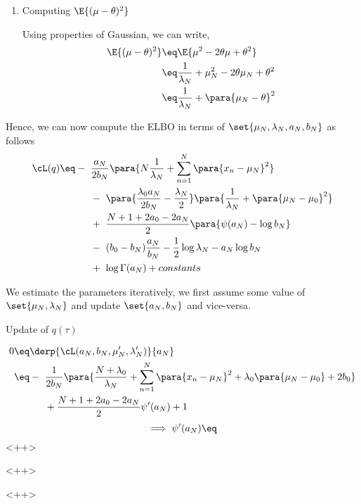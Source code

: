 \documentclass{article}
\begin{document}
\begin{question}
\begin{enumerate}[label=\bt{\theenumi.}]
		\item Computing $\E{(\mu - \theta)^2}$

			Using properties of Gaussian, we can write,
			\begin{align*}
				\E{(\mu - \theta)^2}	&\eq	\E{\mu^2 - 2 \theta \mu + \theta^2} \\
				&\eq	\frac{1}{\lambda_N} +  \mu_N^2 - 2 \theta \mu_N + \theta^2 \\
				&\eq	\frac{1}{\lambda_N} + \para{\mu_N - \theta}^2
			\end{align*}

	\end{enumerate}

	Hence, we can now compute the ELBO in terms of $\set{\mu_N, \lambda_N, a_N, b_N}$ as follows
	\begin{align*}
		\cL(q)	&\eq	- \ \frac{a_N}{2 b_N} \para{N \frac{1}{\lambda_N} + \sum_{n = 1}^N \para{x_n - \mu_N}^2} \\
		&\hspace{1.1cm} - \ \para{\frac{\lambda_0 a_N}{2 b_N} - \frac{\lambda_N}{2}} \para{\frac{1}{\lambda_N} + \para{\mu_N - \mu_0}^2} \\
		&\hspace{1.1cm} + \ \frac{N + 1 + 2 a_0 - 2 a_N}{2} \para{\psi(a_N) - \log{b_N}} \\
		&\hspace{1.1cm} - \ (b_0 - b_N) \frac{a_N}{b_N} - \frac{1}{2} \log{\lambda_N} - a_N \log{b_N} \\
		&\hspace{1.1cm} + \ \log{\Gamma(a_N)} + constants
	\end{align*}

	We estimate the parameters iteratively, \ie we first assume some value of $\set{\mu_N, \lambda_N}$ and update $\set{a_N, b_N}$ and vice-versa.

	\begin{qsubsection}{\boldmath Update of $q(\tau)$}

		\begin{align*}
			0	&\eq	\derp{\cL(a_N, b_N, \mu'_N, \lambda'_N)}{a_N} \\
			&\eq	- \ \frac{1}{2 b_N} \para{\frac{N + \lambda_0}{\lambda_N} + \sum_{n = 1}^N \para{x_n - \mu_N}^2 + \lambda_0 \para{\mu_N - \mu_0} + 2 b_0} \\
			&\hspace{1.1cm} + \frac{N + 1 + 2 a_0 - 2 a_N}{2} \psi'(a_N) + 1
		\end{align*}
		\begin{equation}
			\implies	\psi'(a_N)	\eq	
			\label{<+label+>}
		\end{equation}<++>

	\end{qsubsection}<++>

\end{question}<++>
\end{document}
